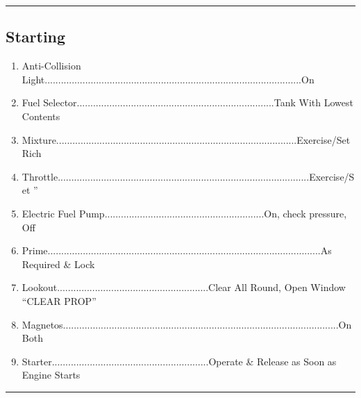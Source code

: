 \documentclass[a4paper]{article}
\newenvironment{numberedchecklist}{
  \begin{enumerate}[label=\arabic*., leftmargin=*, align=left]
    \setlength{\itemsep}{2pt}
    \setlength{\parskip}{0pt}
    \setlength{\parsep}{0pt}
}{
  \end{enumerate}
}
\begin{document}
\rule{\linewidth}{0.4pt}

\subsection*{Starting}
\begin{numberedchecklist}
\item Anti-Collision Light...............................................................................................On
\item Fuel Selector.........................................................................Tank With Lowest Contents
\item Mixture.........................................................................................Exercise/Set Rich
\item Throttle.............................................................................................Exercise/Set \textonequarter”
\item Electric Fuel Pump...........................................................On, check pressure, Off
\item Prime.....................................................................................................As Required \& Lock
\item Lookout........................................................Clear All Round, Open Window “CLEAR PROP”
\item Magnetos......................................................................................................On Both
\item Starter..........................................................Operate \& Release as Soon as Engine Starts
\end{numberedchecklist}

\rule{\linewidth}{0.4pt}
\end{document}

